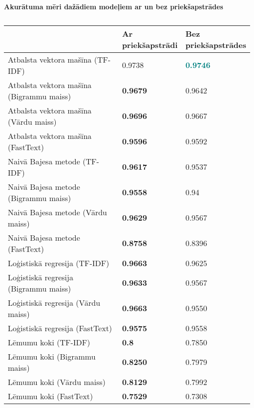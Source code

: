 \begin{table}[H]
\centering
\caption{\label{tab:accuracy_all}}
\textbf{Akurātuma mēri dažādiem modeļiem ar un bez priekšapstrādes\\}
\begin{tabular}{|l|l|l|}
\hline
                                         & \makecell{Ar \\ priekšapstrādi} & \makecell{Bez \\ priekšapstrādes}  \\ \hline
Atbalsta vektora mašīna (TF-IDF)         & 0.9738   & \textbf{\textcolor{teal}{0.9746}}  \\ \hline
Atbalsta vektora mašīna (Bigrammu maiss) & \textbf{0.9679}   & 0.9642\\ \hline
Atbalsta vektora mašīna (Vārdu maiss)    & \textbf{0.9696}   & 0.9667  \\ \hline
Atbalsta vektora mašīna (FastText)       & \textbf{0.9596}            & 0.9592 \\ \hline
Naivā Bajesa metode (TF-IDF)             & \textbf{0.9617}   & 0.9537 \\ \hline
Naivā Bajesa metode (Bigrammu maiss)     & \textbf{0.9558}   & 0.94  \\ \hline
Naivā Bajesa metode (Vārdu maiss)        & \textbf{0.9629}   & 0.9567 \\ \hline
Naivā Bajesa metode (FastText)           & \textbf{0.8758}     & 0.8396 \\ \hline
Loģistiskā regresija (TF-IDF)            & \textbf{0.9663}            & 0.9625 \\ \hline
Loģistiskā regresija (Bigrammu maiss)    & \textbf{0.9633}   & 0.9567 \\ \hline
Loģistiskā regresija (Vārdu maiss)       & \textbf{0.9663}   & 0.9550 \\ \hline
Loģistiskā regresija (FastText)          & \textbf{0.9575}   & 0.9558 \\ \hline
Lēmumu koki (TF-IDF)                     & \textbf{0.8}   & 0.7850 \\ \hline
Lēmumu koki (Bigrammu maiss)             & \textbf{0.8250}   & 0.7979  \\ \hline
Lēmumu koki (Vārdu maiss)                & \textbf{0.8129}            & 0.7992 \\ \hline
Lēmumu koki (FastText)                   & \textbf{0.7529}   & 0.7308 \\ \hline
\end{tabular}
\end{table}

